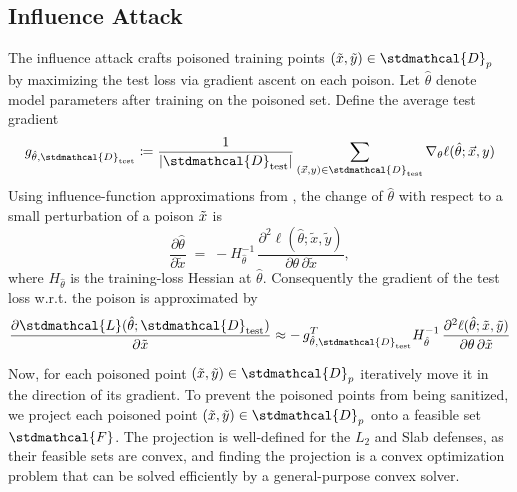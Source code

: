 \documentclass[11pt]{report}
\theoremstyle{remark}
\begin{document}
\subsection{Influence Attack}
The influence attack crafts poisoned training points $(\Tilde{x},\Tilde{y})\in\stdmathcal{D}_p$ by maximizing the test loss via gradient ascent on each poison. Let $\hat{\theta}$ denote model parameters after training on the poisoned set. Define the average test gradient
\[
g_{\hat{\theta},\stdmathcal{D}_{\text{test}}} \coloneqq \frac{1}{|\stdmathcal{D}_{\text{test}}|}\sum_{(\Vec{x},y)\in\stdmathcal{D}_{\text{test}}}\nabla_\theta \ell(\hat{\theta};\Vec{x},y)
\]
Using influence-function approximations from \cite{koh2017understanding}, the change of $\hat{\theta}$ with respect to a small perturbation of a poison $\Tilde{x}$ is
\[
\frac{\partial\hat{\theta}}{\partial\tilde{x}} \;=\; -H_{\hat{\theta}}^{-1}\,\frac{\partial^2 \ell(\hat{\theta};\tilde{x},\tilde{y})}{\partial\theta\,\partial\tilde{x}},
\]
where $H_{\hat{\theta}}$ is the training-loss Hessian at $\hat{\theta}$. Consequently the gradient of the test loss w.r.t. the poison is approximated by
\[
\frac{\partial \stdmathcal{L}(\hat{\theta};\stdmathcal{D}_{\text{test}})}{\partial\tilde{x}}
\approx -\,g_{\hat{\theta},\stdmathcal{D}_{\text{test}}}^T H_{\hat{\theta}}^{-1}\,\frac{\partial^2 \ell(\hat{\theta};\tilde{x},\tilde{y})}{\partial\theta\,\partial\tilde{x}}
\]

Now, for each poisoned point $(\Tilde{x},\Tilde{y})\in\stdmathcal{D}_p$ iteratively move it in the direction of its gradient. To prevent the poisoned points from being sanitized, we project each poisoned point $(\Tilde{x},\Tilde{y})\in\stdmathcal{D}_p$ onto a feasible set $\stdmathcal{F}$. The projection is well-defined for the $L_2$ and Slab defenses, as their feasible sets are convex, and finding the projection is a convex optimization problem that can be solved efficiently by a general-purpose convex solver.

\nocite{*}


\end{document}
